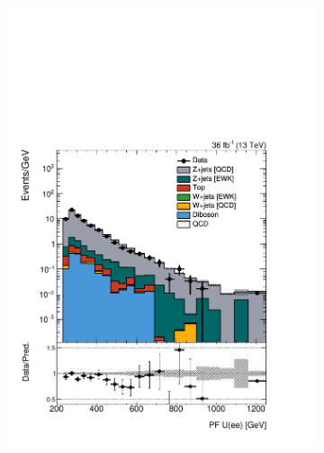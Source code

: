 \begin{figure}[]
\begin{center}
\begin{subfigure}[t]{0.24\textwidth}
            \includegraphics[width=\textwidth]{figures/vbf/prefit/dielectron_pfUZmag_logy.pdf}
        \end{subfigure} \\ 
        \begin{subfigure}[t]{0.24\textwidth}

\end{subfigure}
\end{center}
\end{figure}
